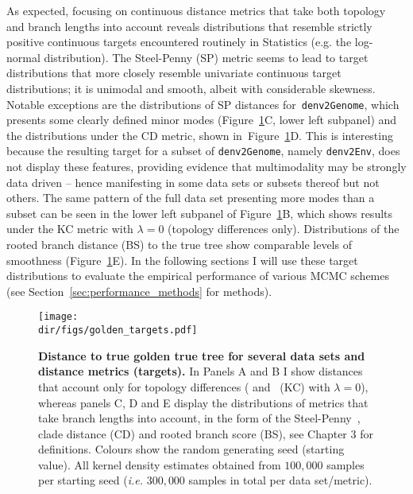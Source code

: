 As expected, focusing on continuous distance metrics that take both topology and branch lengths into account reveals distributions that resemble strictly positive continuous targets encountered routinely in Statistics (e.g. the log-normal distribution).
The Steel-Penny (SP) metric seems to lead to target distributions that more closely resemble univariate continuous target distributions; it is unimodal and smooth, albeit with considerable skewness.
Notable exceptions are the distributions of SP distances for~\verb|denv2Genome|, which presents some clearly defined minor modes (Figure~\ref{fig:target_golden}C, lower left subpanel) and the distributions under the CD metric, shown in~Figure~\ref{fig:target_golden}D.
This is interesting  because the resulting target for a subset of \verb|denv2Genome|, namely \verb|denv2Env|, does not display these features, providing evidence that multimodality may be strongly data driven -- hence manifesting in some data sets or subsets thereof but not others.
The same pattern of the full data set presenting more modes than a subset can be seen in the lower left subpanel of Figure~\ref{fig:target_golden}B, which shows results under the KC metric with $\lambda = 0$  (topology differences only).
Distributions of the rooted branch distance (BS) to the true tree show comparable levels of smoothness (Figure~\ref{fig:target_golden}E).
In the following sections I will use these target distributions to evaluate the empirical performance of various MCMC schemes (see Section~\ref{sec:performance_methods} for methods).

\begin{figure}[!ht]
\begin{center}
\texttt{[image: \\dir/figs/golden\_targets.pdf]} 
\end{center}
 \caption[Distance to true golden true tree for several data sets and distance metrics (targets).]{\textbf{Distance to true golden true tree for several data sets and distance metrics (targets).}
 In Panels A and B I show distances that account only for topology differences (\cite{Robinson1981} and~\cite{Kendall2016} (KC) with $\lambda = 0$), whereas panels C, D and E display the distributions of metrics that take branch lengths into account, in the form of the Steel-Penny~\citep{Steel1993}, clade distance (CD) and rooted branch score (BS), see Chapter 3 for definitions.
 Colours show the random generating seed (starting value).
 All kernel density estimates obtained from $100, 000$ samples per starting seed (\textit{i.e.} $300, 000$ samples in total per data set/metric).
 }
 \label{fig:target_golden}
\end{figure}

